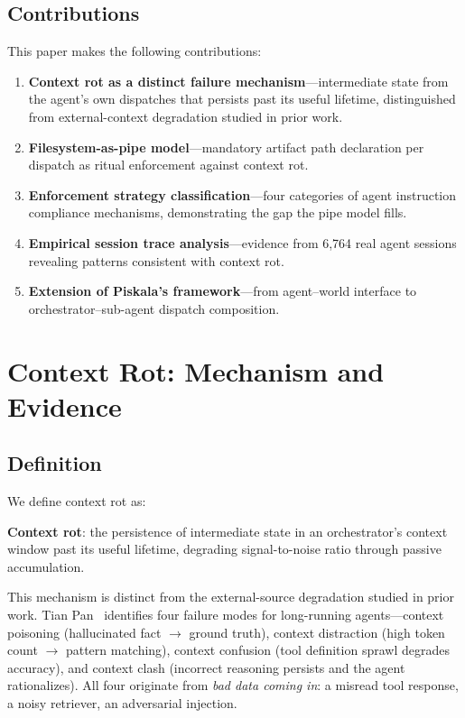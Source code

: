 \documentclass[11pt,a4paper]{article}
\begin{document}
\subsection{Contributions}
This paper makes the following contributions:
\begin{enumerate}[nosep]
  \item \textbf{Context rot as a distinct failure mechanism}---intermediate state from the agent's own dispatches that persists past its useful lifetime, distinguished from external-context degradation studied in prior work.
  \item \textbf{Filesystem-as-pipe model}---mandatory artifact path declaration per dispatch as ritual enforcement against context rot.
  \item \textbf{Enforcement strategy classification}---four categories of agent instruction compliance mechanisms, demonstrating the gap the pipe model fills.
  \item \textbf{Empirical session trace analysis}---evidence from 6,764 real agent sessions revealing patterns consistent with context rot.
  \item \textbf{Extension of Piskala's framework}---from agent--world interface to orchestrator--sub-agent dispatch composition.
\end{enumerate}

\section{Context Rot: Mechanism and Evidence}
\label{sec:rot}

\subsection{Definition}
We define context rot as:

\begin{bluebox}
\textbf{Context rot}: the persistence of intermediate state in an orchestrator's context window past its useful lifetime, degrading signal-to-noise ratio through passive accumulation.
\end{bluebox}

This mechanism is distinct from the external-source degradation studied in prior work. Tian Pan~\cite{tianpan2026} identifies four failure modes for long-running agents---context poisoning (hallucinated fact $\to$ ground truth), context distraction (high token count $\to$ pattern matching), context confusion (tool definition sprawl degrades accuracy), and context clash (incorrect reasoning persists and the agent rationalizes). All four originate from \emph{bad data coming in}: a misread tool response, a noisy retriever, an adversarial injection.
\end{document}
